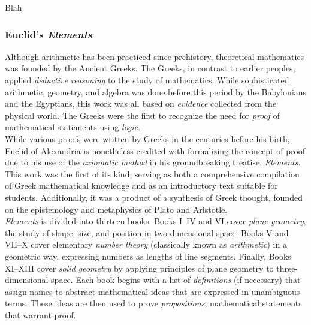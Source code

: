
Blah

\subsubsection{Euclid's \textit{Elements}}

Although arithmetic has been practiced since prehistory, theoretical mathematics was founded by the Ancient Greeks. The Greeks, in contrast to earlier peoples, applied \textit{deductive reasoning} to the study of mathematics. While sophisticated arithmetic, geometry, and algebra was done before this period by the Babylonians and the Egyptians, this work was all based on \textit{evidence} collected from the physical world. The Greeks were the first to recognize the need for \textit{proof} of mathematical statements using \textit{logic}. \\


While various proofs were written by Greeks in the centuries before his birth, Euclid of Alexandria is nonetheless credited with formalizing the concept of proof due to his use of the \textit{axiomatic method} in his groundbreaking treatise, \textit{Elements}. This work was the first of its kind, serving as both a comprehensive compilation of Greek mathematical knowledge and as an introductory text suitable for students. Additionally, it was a product of a synthesis of Greek thought, founded on the epistemology and metaphysics of Plato and Aristotle. \\

\textit{Elements} is divided into thirteen books. Books I--IV and VI cover \textit{plane geometry}, the study of shape, size, and position in two-dimensional space. Books V and VII--X cover elementary \textit{number theory} (classically known as \textit{arithmetic}) in a geometric way, expressing numbers as lengths of line segments. Finally, Books XI--XIII cover \textit{solid geometry} by applying principles of plane geometry to three-dimensional space. Each book begins with a list of \textit{definitions} (if necessary) that assign names to abstract mathematical ideas that are expressed in unambiguous terms. These ideas are then used to prove \textit{propositions}, mathematical statements that warrant proof. \\

